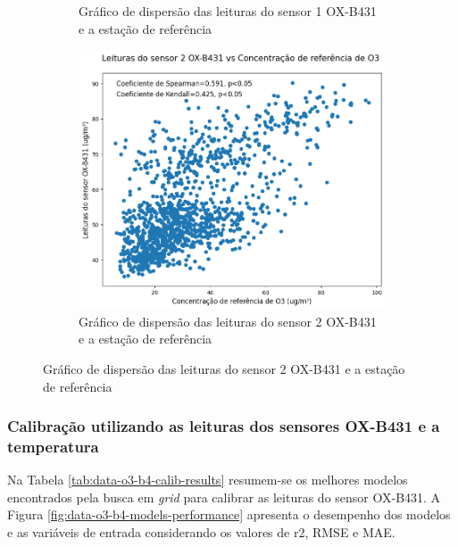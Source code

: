 \begin{figure}[h]
\begin{subfigure}{0.495\textwidth}
        \caption{Gráfico de dispersão das leituras do sensor 1 OX-B431 e a estação de referência}
        \label{fig:data-o3-1-reference-corr}
    \end{subfigure}
    \hfill
    \begin{subfigure}{0.495\textwidth}
        \includegraphics[width=\textwidth]{chapters/3-RESULTADOS CAMPO/Figuras/o3-b4-2-reference-correlation.png}
        \caption{Gráfico de dispersão das leituras do sensor 2 OX-B431 e a estação de referência}
        \label{fig:data-o3-2-reference-corr}
    \end{subfigure}
\end{figure}

\subsubsection{Calibração utilizando as leituras dos sensores OX-B431 e a temperatura}

Na Tabela \ref{tab:data-o3-b4-calib-results} resumem-se os melhores modelos encontrados pela busca em \textit{grid} para calibrar as leituras do sensor OX-B431. A Figura \ref{fig:data-o3-b4-models-performance} apresenta o desempenho dos modelos e as variáveis de entrada considerando os valores de r2, RMSE e MAE.

